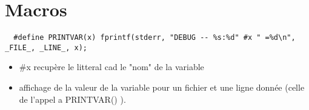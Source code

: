 \documentclass{article}
\begin{document}
  \section*{Macros}
  \begin{verbatim}
  #define PRINTVAR(x) fprintf(stderr, "DEBUG -- %s:%d" #x " =%d\n", _FILE_, _LINE_, x);
\end{verbatim}
  \begin{itemize}
    \item \#x recupère le litteral cad le "nom" de la variable
    \item affichage de la valeur de la variable pour un fichier et une	ligne donnée (celle de l'appel a PRINTVAR() ).
  \end{itemize}
\end{document}
